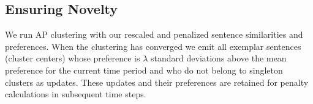 \subsection{Ensuring Novelty}
\label{sec:novelty}
We run AP clustering with our rescaled and penalized sentence similarities
and preferences. When the clustering has converged we emit all exemplar
sentences (cluster centers) whose preference is $\lambda$ standard deviations
above the mean preference for the current time period and who do not belong
to singleton clusters as updates. These updates and their preferences are 
retained for penalty calculations in subsequent time steps.



